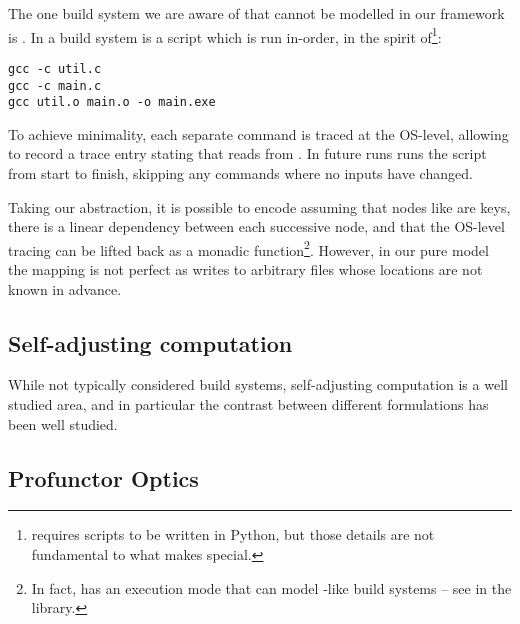 The one build system we are aware of that cannot be modelled in our framework is \Fabricate \cite{fabricate}. In \Fabricate a build system is a script which is run in-order, in the spirit of\footnote{\Fabricate requires scripts to be written in Python, but those details are not fundamental to what makes \Fabricate special.}:

\begin{verbatim}
gcc -c util.c
gcc -c main.c
gcc util.o main.o -o main.exe
\end{verbatim}

To achieve minimality, each separate command is traced at the OS-level, allowing \Fabricate to record a trace entry stating that  reads from . In future runs \Fabricate runs the script from start to finish, skipping any commands where no inputs have changed.

Taking our abstraction, it is possible to encode \Fabricate assuming that nodes like  are keys, there is a linear dependency between each successive node, and that the OS-level tracing can be lifted back as a monadic  function\footnote{In fact, \Shake has an execution mode that can model \Fabricate{}-like build systems -- see  in the \Shake library.}. However, in our pure model the mapping is not perfect as  writes to arbitrary files whose locations are not known in advance.


\subsection{Self-adjusting computation}

While not typically considered build systems, self-adjusting computation is a well studied area, and in particular the contrast between different formulations has been well studied. 

\subsection{Profunctor Optics}\label{sec-related-optics}

